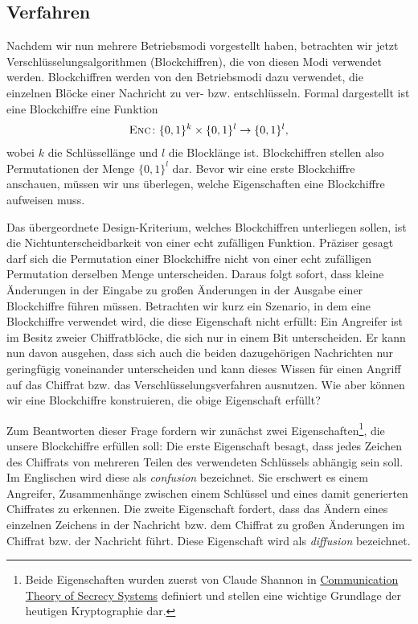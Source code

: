 \subsection{Verfahren}
Nachdem wir nun mehrere Betriebsmodi vorgestellt haben, betrachten wir jetzt Verschlüsselungsalgorithmen (Blockchiffren), die von diesen Modi verwendet werden. Blockchiffren werden von den Betriebsmodi dazu verwendet, die einzelnen Blöcke einer Nachricht zu ver- bzw. entschlüsseln. Formal dargestellt ist eine Blockchiffre eine Funktion
\begin{align*}
	\textsc{Enc} \colon \{0, 1\}^k \times \{0, 1\}^l \rightarrow \{0, 1\}^l,
\end{align*}
wobei \(k\) die Schlüssellänge und \(l\) die Blocklänge ist. Blockchiffren stellen also Permutationen der Menge 
\(\{0, 1\}^l\) dar.
Bevor wir eine erste Blockchiffre anschauen, müssen wir uns überlegen, welche Eigenschaften eine Blockchiffre aufweisen muss.

Das übergeordnete Design-Kriterium, welches Blockchiffren unterliegen sollen, ist die Nichtunterscheidbarkeit von einer echt zufälligen Funktion. Präziser gesagt darf sich die Permutation einer Blockchiffre nicht von einer echt zufälligen Permutation derselben Menge unterscheiden. Daraus folgt sofort, dass kleine Änderungen in der Eingabe zu großen Änderungen in der Ausgabe einer Blockchiffre führen müssen. Betrachten wir kurz ein Szenario, in dem eine Blockchiffre verwendet wird, die diese Eigenschaft nicht erfüllt: Ein Angreifer ist im Besitz zweier Chiffratblöcke, die sich nur in einem Bit unterscheiden. Er kann nun davon ausgehen, dass sich auch die beiden dazugehörigen Nachrichten nur geringfügig voneinander unterscheiden und kann dieses Wissen für einen Angriff auf das Chiffrat bzw. das Verschlüsselungsverfahren ausnutzen. Wie aber können wir eine Blockchiffre konstruieren, die obige Eigenschaft erfüllt?

Zum Beantworten dieser Frage fordern wir zunächst zwei Eigenschaften\footnote{Beide Eigenschaften wurden zuerst von Claude Shannon in \href{http://netlab.cs.ucla.edu/wiki/files/shannon1949.pdf}{Communication Theory of Secrecy Systems} definiert und stellen eine wichtige Grundlage der heutigen Kryptographie dar.}, die unsere Blockchiffre erfüllen soll:
Die erste Eigenschaft besagt, dass jedes Zeichen des Chiffrats von mehreren Teilen des verwendeten Schlüssels abhängig sein soll. Im Englischen wird diese als \textit{confusion} bezeichnet. Sie erschwert es einem Angreifer, Zusammenhänge zwischen einem Schlüssel und eines damit generierten Chiffrates zu erkennen.
Die zweite Eigenschaft fordert, dass das Ändern eines einzelnen Zeichens in der Nachricht bzw. dem Chiffrat zu großen Änderungen im Chiffrat bzw. der Nachricht führt. Diese Eigenschaft wird als \textit{diffusion} bezeichnet.


